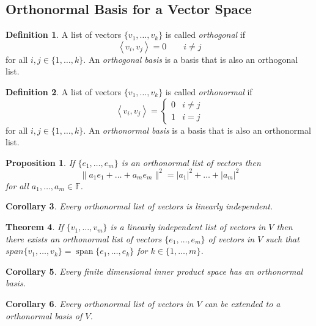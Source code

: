 \documentclass[12pt,letterpaper]{article}
\newcommand{\ip}[2]{\left\langle {#1}, {#2}\right\rangle}
\renewcommand{\span}{\operatorname {span}}
\theoremstyle{plain}
\newtheorem{theorem}{Theorem}[section]
\newtheorem{proposition}{Proposition}[section]
\newtheorem{corollary}[theorem]{Corollary}
\theoremstyle{definition}
\newtheorem{definition}[theorem]{Definition}
\numberwithin{equation}{section}
\begin{document}
\subsection{Orthonormal Basis for a Vector Space}
\begin{definition} A list of vectors $\{v_1, \ldots, v_k\}$ is called \emph{orthogonal} if
\[\ip{v_i}{v_j}=0 \quad \quad i\neq j \]
for all $i,j\in \{1,\ldots, k\}$. An \emph{orthogonal basis} is a basis that is also an orthogonal list.

\end{definition}
\begin{definition} A list of vectors $\{v_1, \ldots, v_k\}$ is called \emph{orthonormal} if
\[\ip{v_i}{v_j}=\left\{\begin{array}{lr}0 & i\neq j \\ 1 & i=j\end{array}\right.\]
for all $i,j\in \{1,\ldots, k\}$. An \emph{orthonormal basis} is a basis that is also an orthonormal list.
\end{definition}

\begin{proposition} If $\{e_1, \ldots, e_m\}$ is an orthonormal list of vectors then 
\[\|a_1e_1+\ldots+a_me_m\|^2=|a_1|^2+\ldots+|a_m|^2\]
for all $a_1, \ldots, a_m\in \mathbb{F}$.
\end{proposition}

\begin{corollary} Every orthonormal list of vectors is linearly independent. 
\end{corollary}

\begin{theorem} If $\{v_1, \ldots, v_m\}$ is a linearly independent list of vectors in $V$ then there exists an orthonormal list of vectors $\{e_1, \ldots, e_m\}$ of vectors in $V$ such that $span\{v_1, \ldots, v_k\}=\span\{e_1, \ldots, e_k\}$ for $k\in\{1, \ldots, m\}$.
\end{theorem}

\begin{corollary} Every finite dimensional inner product space has an orthonormal basis. 
\end{corollary}
\begin{corollary} Every orthonormal list of vectors in $V$ can be extended to a orthonormal basis of $V$. 
\end{corollary}
\end{document}
